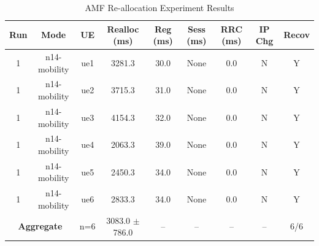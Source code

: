 \begin{table}[ht]
\centering
\begin{tabular}{|c|c|c|c|c|c|c|c|c|}
\hline
Run & Mode & UE & Realloc (ms) & Reg (ms) & Sess (ms) & RRC (ms) & IP Chg & Recov \\
\hline
1 & n14-mobility & ue1 & 3281.3 & 30.0 & None & 0.0 & N & Y \\
1 & n14-mobility & ue2 & 3715.3 & 31.0 & None & 0.0 & N & Y \\
1 & n14-mobility & ue3 & 4154.3 & 32.0 & None & 0.0 & N & Y \\
1 & n14-mobility & ue4 & 2063.3 & 39.0 & None & 0.0 & N & Y \\
1 & n14-mobility & ue5 & 2450.3 & 34.0 & None & 0.0 & N & Y \\
1 & n14-mobility & ue6 & 2833.3 & 34.0 & None & 0.0 & N & Y \\
\multicolumn{2}{|c|}{\textbf{Aggregate}} & n=6 & 3083.0 $\pm$ 786.0 & -- & -- & -- & -- & 6/6 \\
\hline
\end{tabular}
\caption{AMF Re-allocation Experiment Results}
\label{tab:amf_realloc}
\end{table}
